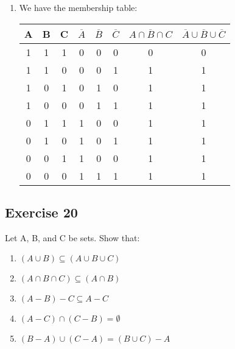 \documentclass{article}
\theoremstyle{mytheoremstyle}
\theoremstyle{mytheoremstyle}
\theoremstyle{myproblemstyle}
\begin{document}
\begin{enumerate} [label = (\alph*)]
            Because we have proved that \(\overline{A \cap B \cap C} \subseteq \overline{A} \cup \overline{B} \cup \overline{C}\) and \(\overline{A} \cup \overline{B} \cup \overline{C} \subseteq \overline{A \cap B \cap C}\) so that
            we can infer \(\overline{A \cap B \cap C} = \overline{A} \cup \overline{B} \cup \overline{C}\).
            \item We have the membership table:\\
                \begin{center}
                    \begin{tabular}{|c|c|c|c|c|c|c|c|}
                        \hline 
                        A & B & C & \(\overline{A}\) & \(\overline{B}\) & \(\overline{C}\) & \(\overline{A \cap B \cap C}\) & \(\overline{A} \cup \overline{B} \cup \overline{C}\)\\
                        \hline 
                        1 & 1 & 1 & 0 & 0 & 0 & 0 & 0\\
                        \hline
                        1 & 1 & 0 & 0 & 0 & 1 & 1 & 1\\
                        \hline 
                        1 & 0 & 1 & 0 & 1 & 0 & 1 & 1\\
                        \hline
                        1 & 0 & 0 & 0 & 1 & 1 & 1 & 1\\
                        \hline
                        0 & 1 & 1 & 1 & 0 & 0 & 1 & 1\\
                        \hline
                        0 & 1 & 0 & 1 & 0 & 1 & 1 & 1\\
                        \hline
                        0 & 0 & 1 & 1 & 0 & 0 & 1 & 1\\
                        \hline 
                        0 & 0 & 0 & 1 & 1 & 1 & 1 & 1\\
                        \hline
                    \end{tabular}
                \end{center}
        \end{enumerate}
    \subsection*{Exercise 20}
        Let A, B, and C be sets. Show that:
        \begin{enumerate} [label = (\alph*)]
            \item \((A \cup B) \subseteq (A \cup B \cup C)\)
            \item \((A \cap B \cap C) \subseteq (A \cap B)\)
            \item \((A - B) - C \subseteq A - C\)
            \item \((A - C) \cap (C - B) = \emptyset\) 
            \item \((B - A) \cup (C - A) = (B \cup C) - A\)
        \end{enumerate} 
\end{document}

